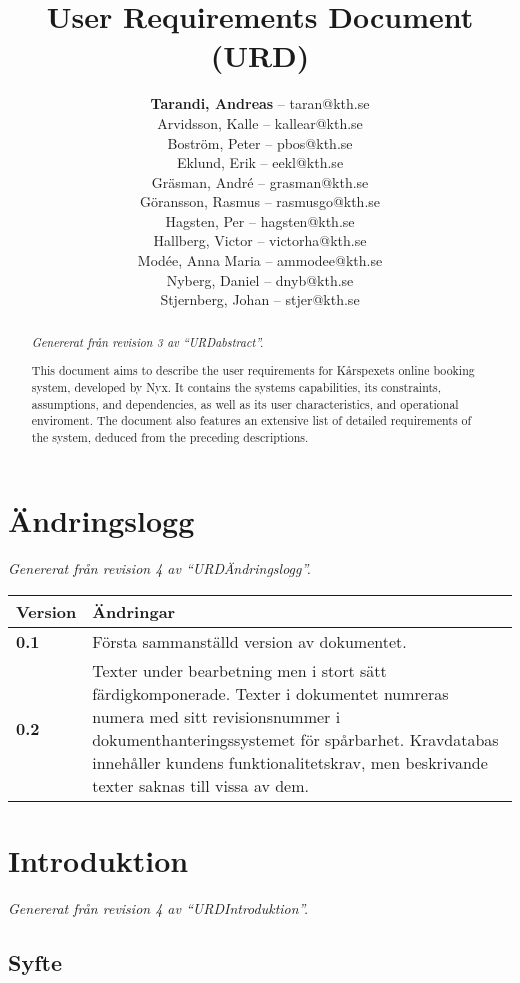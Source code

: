 \documentclass[a4paper, twoside, 11pt, titlepage]{article}
\author{
	\small
	\textbf{Tarandi, Andreas} -- taran@kth.se \\
	Arvidsson, Kalle -- kallear@kth.se\\
	Boström, Peter -- pbos@kth.se\\
	Eklund, Erik -- eekl@kth.se\\
	Gräsman, André -- grasman@kth.se\\
	Göransson, Rasmus -- rasmusgo@kth.se\\
	Hagsten, Per -- hagsten@kth.se\\
	Hallberg, Victor -- victorha@kth.se\\
	Modée, Anna Maria -- ammodee@kth.se\\
	Nyberg, Daniel -- dnyb@kth.se\\
	Stjernberg, Johan -- stjer@kth.se
	}
\title{User Requirements Document (URD)}
\begin{document}
\maketitle

\begin{abstract}
	\emph{Genererat från revision 3 av ``URDabstract''.}


This document aims to describe the user requirements for Kårspexets online booking system, developed by Nyx. It contains the systems capabilities, its constraints, assumptions, and dependencies, as well as its user characteristics, and operational enviroment. The document also features an extensive list of detailed requirements of the system, deduced from the preceding descriptions.
\end{abstract}

\newpage

\tableofcontents

\clearpage
\setcounter{page}{1}

\startfooter

\clearpage
	\section{Ändringslogg}


\emph{Genererat från revision 4 av ``URDÄndringslogg''.}

\begin{tabular} { | p{3cm} | p{12.2cm} | }
	\hline
	\textbf{Version} & \textbf{Ändringar } \\
	\hline
	\textbf{0.1} & Första sammanställd version av dokumentet.  \\
	\hline
	\textbf{0.2} & Texter under bearbetning men i stort sätt färdigkomponerade. Texter i dokumentet numreras numera med sitt revisionsnummer i dokumenthanteringssystemet för spårbarhet. Kravdatabas innehåller kundens funktionalitetskrav, men beskrivande texter saknas till vissa av dem.   \\
	\hline
\end{tabular}


\clearpage
	\section{Introduktion}


\emph{Genererat från revision 4 av ``URDIntroduktion''.}

	\subsection{Syfte}
\end{document}
